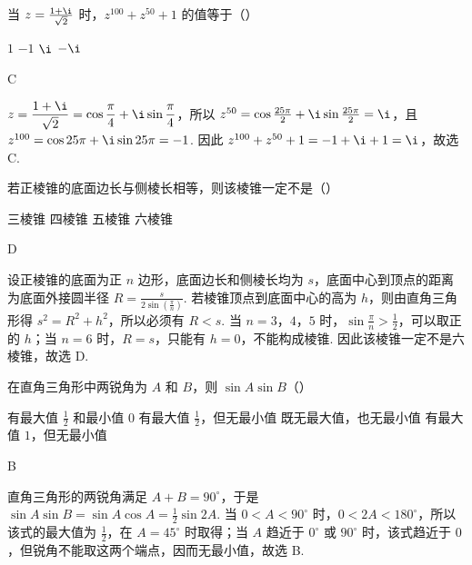 \begin{problem}
当 \(z = \frac{1 + \i}{\sqrt{2}}\) 时，\(z^{100} + z^{50} + 1\) 的值等于（\quad）

\choices
    {\(1\)}
    {\(-1\)}
    {\(\i\)}
    {\(-\i\)}
\end{problem}

\begin{answer}
C
\end{answer}

\begin{solution}
\(\displaystyle z=\frac{1+\i}{\sqrt{2}}=\cos\frac{\pi}{4}+\i\sin\frac{\pi}{4}\)，所以
\(z^{50}=\cos\frac{25\pi}{2}+\i\sin\frac{25\pi}{2}=\i\)，且 \(z^{100}=\cos25\pi+\i\sin25\pi=-1\). 因此 \(z^{100}+z^{50}+1=-1+\i+1=\i\)，故选 C.
\end{solution}

\begin{problem}
若正棱锥的底面边长与侧棱长相等，则该棱锥一定不是（\quad）

\choices
    {三棱锥}
    {四棱锥}
    {五棱锥}
    {六棱锥}
\end{problem}

\begin{answer}
D
\end{answer}

\begin{solution}
设正棱锥的底面为正 \(n\) 边形，底面边长和侧棱长均为 \(s\)，底面中心到顶点的距离为底面外接圆半径 \(R=\frac{s}{2\sin(\frac{\pi}{n})}\). 若棱锥顶点到底面中心的高为 \(h\)，则由直角三角形得 \(s^2=R^2+h^2\)，所以必须有 \(R<s\). 当 \(n=3\)，\(4\)，\(5\) 时，\(\sin\frac{\pi}{n}>\frac{1}{2}\)，可以取正的 \(h\)；当 \(n=6\) 时，\(R=s\)，只能有 \(h=0\)，不能构成棱锥. 因此该棱锥一定不是六棱锥，故选 D.
\end{solution}

\begin{problem}
在直角三角形中两锐角为 \(A\) 和 \(B\)，则 \(\sin A\sin B\)（\quad）

\choices
    {有最大值 \(\frac{1}{2}\) 和最小值 \(0\)}
    {有最大值 \(\frac{1}{2}\)，但无最小值}
    {既无最大值，也无最小值}
    {有最大值 \(1\)，但无最小值}
\end{problem}

\begin{answer}
B
\end{answer}

\begin{solution}
直角三角形的两锐角满足 \(A+B=90^\circ\)，于是
\(\sin A\sin B=\sin A\cos A=\frac{1}{2}\sin 2A\). 当 \(0<A<90^\circ\) 时，\(0<2A<180^\circ\)，所以该式的最大值为 \(\frac{1}{2}\)，在 \(A=45^\circ\) 时取得；当 \(A\) 趋近于 \(0^\circ\) 或 \(90^\circ\) 时，该式趋近于 \(0\)，但锐角不能取这两个端点，因而无最小值，故选 B.
\end{solution}

